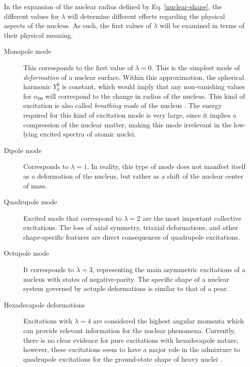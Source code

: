 In the expansion of the nuclear radius defined by Eq. 
\ref{nuclear-shape}, the different values for $\lambda$ will determine different effects regarding the physical aspects of the nucleus. As such, the first values of $\lambda$ will be examined in terms of their physical meaning.
\begin{description}
    \item[Monopole mode] This corresponds to the first value of $\lambda=0$. This is the simplest mode of \emph{deformation} of a nuclear surface. Within this approximation, the spherical harmonic $Y_0^0$ is constant, which would imply that any non-vanishing values for $\alpha_{00}$ will correspond to the change in radius of the nucleus. This kind of excitation is also called \emph{breathing mode} of the nucleus \cite{greiner1996nuclear,bohr1998nuclear}. The energy required for this kind of excitation mode is very large, since it implies a compression of the nuclear matter, making this mode irrelevant in the low-lying excited spectra of atomic nuclei.
    \item[Dipole mode] Corresponds to $\lambda=1$. In reality, this type of mode does not manifest itself as a deformation of the nucleus, but rather as a shift of the nuclear center of mass.
    \item[Quadrupole mode] Excited mode that correspond to $\lambda=2$ are the most important collective excitations. The loss of axial symmetry, triaxial deformations, and other shape-specific features are direct consequences of quadrupole excitations.
    \item[Octupole mode] It corresponds to $\lambda=3$, representing the main asymmetric excitations of a nucleus with states of negative-parity. The specific shape of a nuclear system governed by octuple deformations is similar to that of a pear.
    \item[Hexadecapole deformations] Excitations with $\lambda=4$ are considered the highest angular momenta which can provide relevant information for the nuclear phenomena. Currently, there is no clear evidence for pure excitations with hexadecapole nature, however, these excitations seem to have a major role in the admixture to quadrupole excitations for the ground-state shape of heavy nuclei \cite{greiner1996nuclear}.
\end{description}

